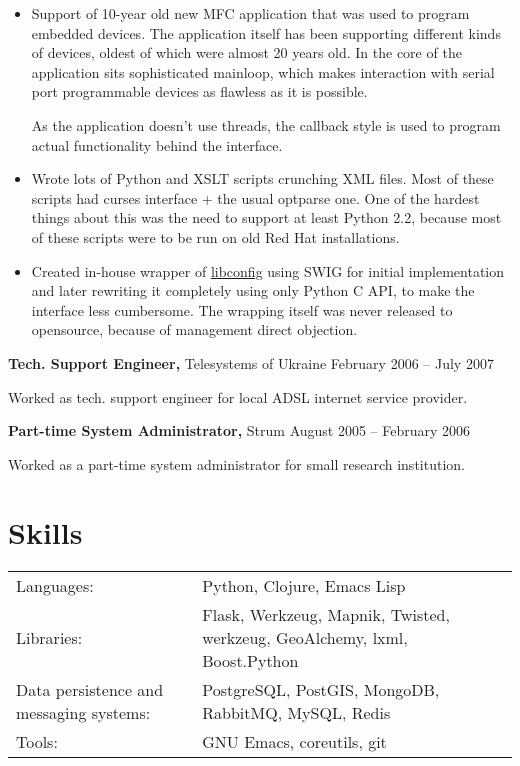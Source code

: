 \documentclass[margin]{res}
\begin{document}
\begin{resume}
\begin{itemize} \itemsep -1pt
\item Support of 10-year old new MFC application
  that was used to program embedded devices. The application itself
  has been supporting different kinds of devices, oldest of which
  were almost 20 years old. In the core of the application sits
  sophisticated mainloop, which makes interaction with serial port
  programmable devices as flawless as it is possible.




















  As the application doesn't use threads, the callback style is
  used to program actual functionality behind the interface.
\item Wrote lots of Python and XSLT scripts
  crunching XML files. Most of these scripts had curses interface +
  the usual optparse one. One of the hardest things about this was
  the need to support at least Python 2.2, because most of these scripts
  were to be run on old Red Hat installations.
\item Created in-house wrapper of
  \href{http://www.hyperrealm.com/libconfig/}{libconfig} using SWIG for initial
  implementation and later rewriting it completely using only Python C API, to make
  the interface less cumbersome. The wrapping itself was never released to
  opensource, because of management direct objection.
\end{itemize}



{\bf Tech. Support Engineer,} Telesystems of Ukraine \hfill February 2006 -- July 2007

Worked as tech. support engineer for local ADSL internet service provider.


{\bf Part-time System Administrator,} Strum \hfill August 2005 -- February 2006

Worked as a part-time system administrator for small research institution.


\section{Skills}
\begin{tabular}{l p{3in}}
  Languages: & Python, Clojure, Emacs Lisp \\
  Libraries: & Flask, Werkzeug, Mapnik, Twisted, werkzeug, GeoAlchemy, lxml, Boost.Python \\
  Data persistence and messaging systems: & PostgreSQL, PostGIS, MongoDB, RabbitMQ, MySQL, Redis \\
  Tools: & GNU Emacs, coreutils, git
\end{tabular}


\end{resume}
\end{document}
